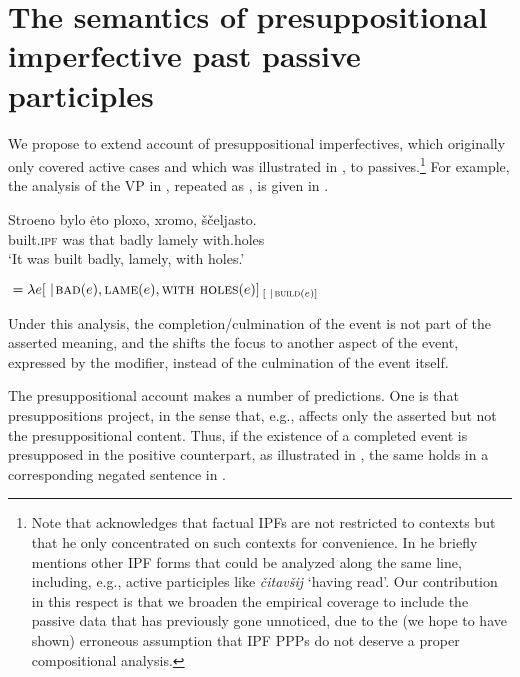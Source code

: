 \documentclass[output=paper,modfonts,newtxmath,hidelinks]{langscibook}
\begin{document}
\section{The semantics of presuppositional imperfective past passive participles}
\label{analysis}

We propose to extend  account of presuppositional imperfectives, which originally only covered active cases and which was illustrated in , to passives.\footnote{Note that \citet{gronndiss} acknowledges that factual IPFs are not restricted to  contexts but that he only concentrated on such contexts for convenience. In \citet{gronn15} he briefly mentions other IPF forms that could be analyzed along the same line, including, e.g.,  active participles like \textit{čitavšij} `having read'. Our contribution in this respect is that we broaden the empirical coverage to include the passive data that has previously gone unnoticed, due to the (we hope to have shown) erroneous assumption that IPF PPPs do not deserve a proper compositional analysis.} For example, the analysis of the VP in , repeated as , is given in .

\ea\gll	Stroeno bylo \.{e}to ploxo, xromo, ščeljasto.\\
	built.\textsc{ipf} was that badly lamely with.holes\\
    \glt	`It was built badly, lamely, with holes.'\label{ploxo}
    \z

\ea {}${}=\lambda e[ \hspace{0.3em}|\hspace{0.1em} \textsc{bad}(e), \textsc{lame}(e), \textsc{with holes}(e)]_{\hspace{2pt}[ \hspace{0.3em} |\hspace{0.1em}\textsc{build}(e)]}$\label{ploxoanalysis}
\z

\noindent Under this analysis, the completion/culmination of the event is not part of the asserted meaning, and the  shifts the focus to another aspect of the event, expressed by the  modifier, instead of the culmination of the event itself. 

The presuppositional account makes a number of predictions. One is that presuppositions project, in the sense that, e.g.,  affects only the asserted but not the presuppositional content. Thus, if the existence of a completed event is presupposed in the positive counterpart, as illustrated in , the same holds in a corresponding negated sentence in .
\end{document}
